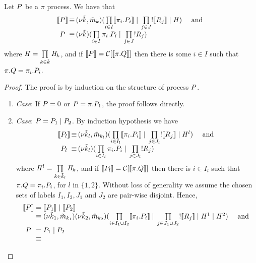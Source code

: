 \begin{lemma}\label{lem:shape_of_encoded_processes}
Let $P$ be a $\pi$ process.  We have that
\[
\begin{array}{c@{\,}c@{\,}l}
\enc{\PP}
& \equiv & \rest{\tilde{\NK},\tilde{\NM}_\NK}(\prod\limits_{i\in I} \enc{\pi_i.\PP_i} \parop \prod\limits_{j\in J} \rep\enc{\PR_j} \parop \handler) \quad  \text{ and }\\
\PP 
& \equiv & \rest{\tilde{\NK}}(\prod\limits_{i\in I} \pi_i.\PP_i \parop \prod\limits_{j\in J}\rep\PR_j )
\end{array}
\]
where $\mathit{H}=\prod\limits_{k\in\tilde{k}}\mathit{H}_k$, 
and if $\llbracket P \rrbracket=\mathcal{C}[\llbracket \pi.Q \rrbracket]$ then there is some $i\in I$ such that $\pi.Q=\pi_i.P_i$.
\end{lemma}
\begin{proof}
The proof is by induction on the structure of process $P$.
\begin{enumerate}
\item  \emph{Case}: If $P=0$ or $P=\pi.P_1$, the proof follows directly.
\item  \emph{Case}: $P=P_1 \;|\; P_2$. By induction hypothesis we have 
\[
\begin{array}{c@{\,}c@{\,}l}
\enc{\PP_l}
& \equiv & \rest{\tilde{\NK}_l,\tilde{\NM}_{\NK_l}}(\prod\limits_{i\in I_l} \enc{\pi_i.\PP_i} \parop \prod\limits_{j\in J_l} \rep\enc{\PR_j} \parop \handler^l) \quad  \text{ and }\\
\PP _l
& \equiv & \rest{\tilde{\NK}_l}(\prod\limits_{i\in I_l} \pi_i.\PP_i \parop \prod\limits_{j\in J_l}\rep\PR_j )
\end{array}
\]
where $\mathit{H}^l=\prod\limits_{k\in\tilde{k}_l}\mathit{H}_k$, and if $\llbracket P_l \rrbracket= \mathcal{C}[\llbracket \pi.Q \rrbracket]$ then there is $i\in I_l$ such that $\pi.Q=\pi_i.P_i$,  for $l$ in $\{1,2\}$.
Without loss of generality we assume the chosen sets of labels $I_1, I_2, J_1$ and $J_2$ are pair-wise disjoint. Hence,
\[
\begin{array}{@{}c@{\;}c@{\;}l@{}}
\enc{\PP}
& = & \enc{\PP_1} \parop \enc{\PP_2}\\ 
& \equiv & 
\rest{\tilde{\NK}_1,\tilde{\NM}_{\NK_1}}\rest{\tilde{\NK}_2,\tilde{\NM}_{\NK_2}}
(\prod\limits_{i\in I_1\cup I_2} \enc{\pi_i.\PP_i} \parop \prod\limits_{j\in J_1\cup J_2} \rep\enc{\PR_j} \parop \handler^1 \parop \handler^2) \quad  \text{ and }\\
\PP
& = & \PP_1 \parop \PP_2\\ 
& \equiv & 

\end{array}\]
\end{enumerate}
\end{proof}
